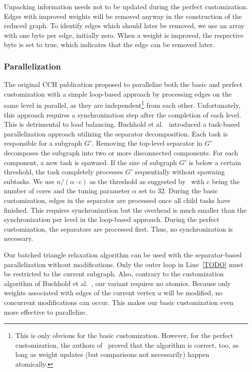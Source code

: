 \documentclass[a4paper, english, cleveref]{lipics-v2021}
\begin{document}
Unpacking information needs not to be updated during the perfect customization.
Edges with improved weights will be removed anyway in the construction of the reduced graph.
To identify edges which should later be removed, we use an array with one byte per edge, initially zero.
When a weight is improved, the respective byte is set to true, which indicates that the edge can be removed later.

\subsubsection{Parallelization}

The original CCH publication proposed to parallelize both the basic and perfect customization with a simple loop-based approach by processing edges on the same level in parallel, as they are independent\footnote{
This is only obvious for the basic customization.
However, for the perfect customization, the authors of~\cite{DibbeltSW16} proved that the algorithm is correct, too, as long as weight updates (but comparisons not necessarily) happen atomically.
} from each other.
Unfortunately, this approach requires a synchronization step after the completion of each level.
This is detrimental to load balancing.
Buchhold et al.~\cite{BuchholdSW19} introduced a task-based parallelization approach utilizing the separator decomposition.
Each task is responsible for a subgraph $G'$.
Removing the top-level separator in $G'$ decomposes the subgraph into two or more disconnected components.
For each component, a new task is spawned.
If the size of subgraph $G'$ is below a certain threshold, the task completely processes $G'$ sequentially without spawning subtasks.
We use $n/(\alpha \cdot c)$ as the threshold as suggested by~\cite{BuchholdSW19} with $c$ being the number of cores and the tuning parameter $\alpha$ set to $32$.
During the basic customization, edges in the separator are processed once all child tasks have finished.
This requires synchronization but the overhead is much smaller than the synchronization per level in the loop-based approach.
During the perfect customization, the separators are processed first.
Thus, no synchronization is necessary.

Our batched triangle relaxation algorithm can be used with the separator-based parallelization without modifications.
Only the outer loop in Line~\ref{TODO} must be restricted to the current subgraph.
Also, contrary to the customization algorithm of Buchhold et al.~\cite{BuchholdSW19}, our variant requires no atomics.
Because only weights associated with edges of the current vertex $u$ will be modified, no concurrent modifications can occur.
This makes our basic customization even more effective to parallelize.
\end{document}
